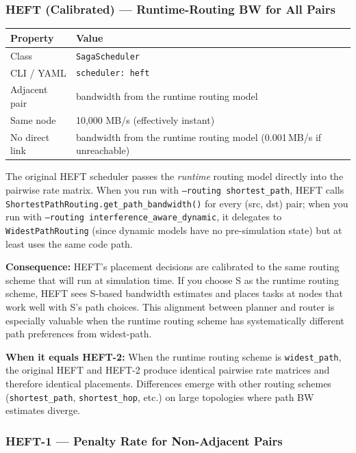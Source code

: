 \documentclass[11pt]{article}
\begin{document}
\subsubsection{HEFT (Calibrated) --- Runtime-Routing BW for All Pairs}

\begin{tabular}{@{}ll@{}}
\toprule
\textbf{Property} & \textbf{Value} \\
\midrule
Class         & \texttt{SagaScheduler} \\
CLI / YAML    & \texttt{scheduler: heft} \\
Adjacent pair & bandwidth from the runtime routing model \\
Same node     & 10{,}000 MB/s (effectively instant) \\
No direct link & bandwidth from the runtime routing model (0.001\,MB/s if unreachable) \\
\bottomrule
\end{tabular}

\medskip
The original HEFT scheduler passes the \emph{runtime} routing model directly
into the pairwise rate matrix.  When you run with \texttt{--routing shortest\_path},
HEFT calls \texttt{ShortestPathRouting.get\_path\_bandwidth()} for every
(src, dst) pair; when you run with \texttt{--routing interference\_aware\_dynamic},
it delegates to \texttt{WidestPathRouting} (since dynamic models have no
pre-simulation state) but at least uses the same code path.

\medskip
\textbf{Consequence:} HEFT's placement decisions are calibrated to the same
routing scheme that will run at simulation time.  If you choose S as the runtime
routing scheme, HEFT sees S-based bandwidth estimates and places tasks at nodes
that work well with S's path choices.  This alignment between planner and router
is especially valuable when the runtime routing scheme has systematically
different path preferences from widest-path.

\medskip
\textbf{When it equals HEFT-2:} When the runtime routing scheme is
\texttt{widest\_path}, the original HEFT and HEFT-2 produce identical pairwise
rate matrices and therefore identical placements.  Differences emerge with
other routing schemes (\texttt{shortest\_path}, \texttt{shortest\_hop}, etc.)
on large topologies where path BW estimates diverge.

\subsubsection{HEFT-1 --- Penalty Rate for Non-Adjacent Pairs}
\end{document}
